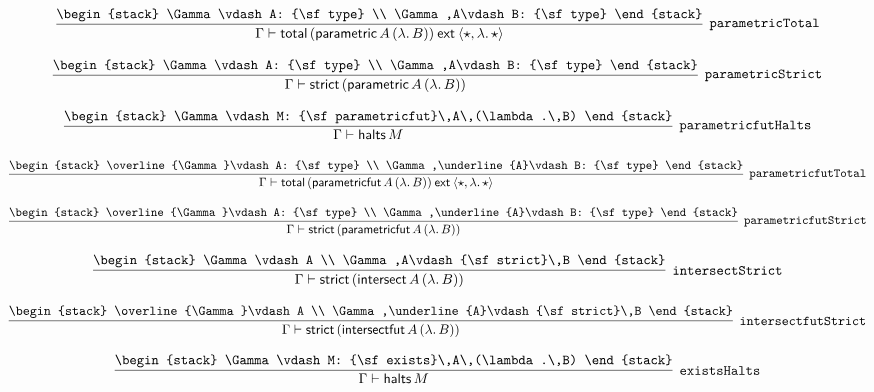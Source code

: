 \[
\infer[{\tt parametricTotal}]{\Gamma \vdash {\sf total}\,({\sf parametric}\,A\,(\lambda .\,B))\:{\sf ext}\:\langle \star ,\lambda .\,\star \rangle }{
\begin{stack}
\Gamma \vdash A: {\sf type}
\\
\Gamma ,A\vdash B: {\sf type}
\end{stack}}
\]

\[
\infer[{\tt parametricStrict}]{\Gamma \vdash {\sf strict}\,({\sf parametric}\,A\,(\lambda .\,B))}{
\begin{stack}
\Gamma \vdash A: {\sf type}
\\
\Gamma ,A\vdash B: {\sf type}
\end{stack}}
\]

\[
\infer[{\tt parametricfutHalts}]{\Gamma \vdash {\sf halts}\,M}{
\begin{stack}
\Gamma \vdash M: {\sf parametricfut}\,A\,(\lambda .\,B)
\end{stack}}
\]

\[
\infer[{\tt parametricfutTotal}]{\Gamma \vdash {\sf total}\,({\sf parametricfut}\,A\,(\lambda .\,B))\:{\sf ext}\:\langle \star ,\lambda .\,\star \rangle }{
\begin{stack}
\overline{\Gamma}\vdash A: {\sf type}
\\
\Gamma ,\underline{A}\vdash B: {\sf type}
\end{stack}}
\]

\[
\infer[{\tt parametricfutStrict}]{\Gamma \vdash {\sf strict}\,({\sf parametricfut}\,A\,(\lambda .\,B))}{
\begin{stack}
\overline{\Gamma}\vdash A: {\sf type}
\\
\Gamma ,\underline{A}\vdash B: {\sf type}
\end{stack}}
\]

\[
\infer[{\tt intersectStrict}]{\Gamma \vdash {\sf strict}\,({\sf intersect}\,A\,(\lambda .\,B))}{
\begin{stack}
\Gamma \vdash A
\\
\Gamma ,A\vdash {\sf strict}\,B
\end{stack}}
\]

\[
\infer[{\tt intersectfutStrict}]{\Gamma \vdash {\sf strict}\,({\sf intersectfut}\,A\,(\lambda .\,B))}{
\begin{stack}
\overline{\Gamma}\vdash A
\\
\Gamma ,\underline{A}\vdash {\sf strict}\,B
\end{stack}}
\]

\[
\infer[{\tt existsHalts}]{\Gamma \vdash {\sf halts}\,M}{
\begin{stack}
\Gamma \vdash M: {\sf exists}\,A\,(\lambda .\,B)
\end{stack}}
\]

